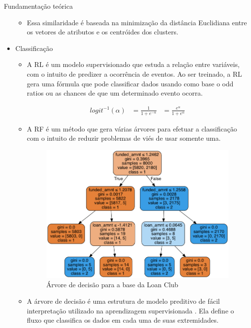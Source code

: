 \documentclass[final,hyperref={pdfpagelabels=false, brazil}]{beamer}
\let\olditem=\item%
\renewcommand{\item}{\olditem \justifying}%
\begin{document}
\begin{frame}[t]
\begin{columns}[t]
\begin{column}{.465\textwidth}
\begin{block}{Fundamenta\c c\~ao te\'orica}
\begin{itemize}
\begin{itemize}
\item Essa similaridade é baseada na minimização da distância Euclidiana entre os vetores de atributos e os centróides dos clusters.

\end{itemize}
\item Classificação
\begin{itemize}
\item A RL é um modelo supervisionado que estuda a relação entre variáveis, com o intuito de predizer a ocorrência de eventos. Ao ser treinado, a RL gera uma fórmula que pode classificar dados usando como base o odd ratios ou as chances de que um determinado evento ocorra\cite{HASTIE}. 

\begin{equation}
  \label{eq:t}
  \begin{aligned}
    logit^{-1}(\alpha) &= \frac{1}{1+e^{-\alpha}} &= \frac{e^{\alpha}}{1+e^{\alpha}}
  \end{aligned}
\end{equation}

\end{itemize}

\begin{itemize}
\item A RF é um método que gera várias árvores para efetuar a classificação com o intuito de reduzir problemas de viés de usar somente uma. 

\begin{figure}
\caption{Árvore de decisão para a base da Loan Club}
\centering
\includegraphics[width=0.65\linewidth]{loan.png}

\end{figure}

\item A árvore de decisão é uma estrutura de modelo preditivo de fácil interpretação utilizado na aprendizagem supervisionada \cite{HASTIE}. Ela define o fluxo que classifica os dados em cada uma de suas extremidades.



\end{itemize}
\end{itemize}
\end{block}
\end{column}
\end{columns}
\end{frame}
\end{document}
